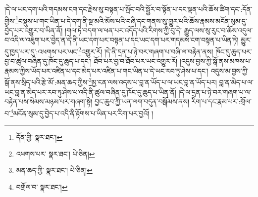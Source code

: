 །དེ་ལ་ཡང་དག་པའི་གདམས་ངག་དང་རྗེས་སུ་བསྟན་པ་སྤོང་བའི་སྦྱོར་བ་སྟོན་པ་དང་ལྡན་པའི་ཆོས་ཚིག་དང་:དོན་གྱིས་\footnote{དོན་གྱི་  སྣར་ཐང་། }བསྡུས་པ་གང་ཡིན་པ་དེ་དག་ནི་སྔ་མའི་མོས་པའི་བཞི་དང་གནས་སུ་གྱུར་པའི་ཆོས་རྣམས་མངོན་སུམ་དུ་བྱེད་པར་འགྱུར་བ་ཡིན་ནོ། །གལ་ཏེ་བདག་ལ་ཕན་པར་འདོད་པའི་རིགས་ཀྱི་བུ་དེ། རྒྱུད་ལས་སུ་རུང་བ་ཆོས་འདུལ་བ་འདི་ལ་འཇུག་པར་བྱེད་ན་དེ་ནི་ཡང་དག་པར་བསྟན་པ་དང་ཡང་དག་པར་གདམས་ངག་བསྟན་པ་ཡིན་ཏེ། མྱུར་དུ་ཁྱད་པར་དུ་:འཕགས་པར་ཡང་\footnote{འཕགས་པར་  སྣར་ཐང་།  པེ་ཅིན། }འགྱུར་རོ། །དེ་ནི་དྲན་པ་ཉེ་བར་གཞག་པ་བཞི་ལ་བརྟེན་ནས། ཁོང་དུ་ཆུད་པར་བྱ་བ་ཚུལ་བཞིན་དུ་ཁོང་དུ་ཆུད་པ་དང་། ཐོབ་པར་བྱ་བ་ཐོབ་པར་ཡང་འགྱུར་རོ། །འདུས་བྱས་ཀྱི་སྒོ་ནས་མཁས་པ་རྣམས་ཀྱིས་ཡོད་པར་འཛིན་པ་དང་མེད་པར་འཛིན་པ་གང་ཡིན་པ་དེ་ཡང་རབ་ཏུ་ཤེས་པ་དང་། འདུས་མ་བྱས་ཀྱི་སྒོ་ནས་སྲིད་པའི་རྩེ་མོ་:མན་ཆད་ཀྱིས་\footnote{མན་ཆད་ཀྱི་  སྣར་ཐང་།  པེ་ཅིན། }མྱ་ངན་ལས་འདས་པ་བླ་ན་ཡོད་པ་ལ་ཡང་བླ་ན་ཡོད་པར། བླ་ན་མེད་པ་ལ་ཡང་བླ་ན་མེད་པར་རབ་ཏུ་ཤེས་པ་འདི་ནི་ཚུལ་བཞིན་དུ་ཁོང་དུ་ཆུད་པ་ཡིན་ནོ། །དེ་ལ་དྲན་པ་ཉེ་བར་གཞག་པ་ལ་བརྟེན་པས་སེམས་མཉམ་པར་གཞག་སྟེ། བྱང་ཆུབ་ཀྱི་ཡན་ལག་བདུན་བསྒོམས་ནས། རིག་པ་དང་རྣམ་པར་:གྲོལ་བ་\footnote{བགྲོལ་བ་  སྣར་ཐང་། }མངོན་སུམ་དུ་བྱེད་པ་འདི་ནི་རྟོགས་པ་ཡིན་པར་རིག་པར་བྱའོ། །
